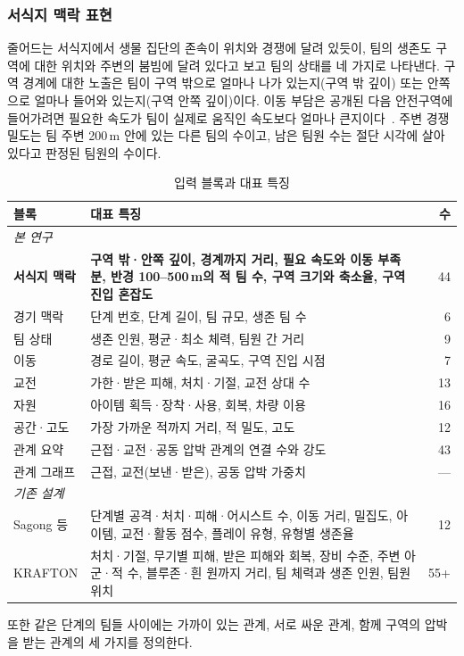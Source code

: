 \subsubsection{서식지 맥락 표현}
\label{sec:method:representation}
줄어드는 서식지에서 생물 집단의 존속이 위치와 경쟁에 달려 있듯이, 팀의 생존도 구역에 대한 위치와 주변의 붐빔에 달려 있다고 보고 팀의 상태를 네 가지로 나타낸다.
구역 경계에 대한 노출은 팀이 구역 밖으로 얼마나 나가 있는지(구역 밖 깊이) 또는 안쪽으로 얼마나 들어와 있는지(구역 안쪽 깊이)이다.
이동 부담은 공개된 다음 안전구역에 들어가려면 필요한 속도가 팀이 실제로 움직인 속도보다 얼마나 큰지이다~\cite{Nathan08}.
주변 경쟁 밀도는 팀 주변 200\,m 안에 있는 다른 팀의 수이고, 남은 팀원 수는 절단 시각에 살아 있다고 판정된 팀원의 수이다.

\begin{table}[t]
\centering
\caption{입력 블록과 대표 특징}
\label{tab:blocks}
\footnotesize
\setlength{\tabcolsep}{3pt}
\renewcommand{\arraystretch}{1.1}
\begin{tabular}{p{1.8cm}p{5.4cm}r}
\hline
블록 & 대표 특징 & 수 \\
\hline
\multicolumn{3}{l}{\emph{본 연구}} \\
\textbf{서식지 맥락} & \textbf{구역 밖·안쪽 깊이, 경계까지 거리, 필요 속도와 이동 부족분, 반경 100--500\,m의 적 팀 수, 구역 크기와 축소율, 구역 진입 혼잡도} & 44 \\
경기 맥락 & 단계 번호, 단계 길이, 팀 규모, 생존 팀 수 & 6 \\
팀 상태 & 생존 인원, 평균·최소 체력, 팀원 간 거리 & 9 \\
이동 & 경로 길이, 평균 속도, 굴곡도, 구역 진입 시점 & 7 \\
교전 & 가한·받은 피해, 처치·기절, 교전 상대 수 & 13 \\
자원 & 아이템 획득·장착·사용, 회복, 차량 이용 & 16 \\
공간·고도 & 가장 가까운 적까지 거리, 적 밀도, 고도 & 12 \\
관계 요약 & 근접·교전·공동 압박 관계의 연결 수와 강도 & 43 \\
관계 그래프 & 근접, 교전(보낸·받은), 공동 압박 가중치 & --- \\
\hline
\multicolumn{3}{l}{\emph{기존 설계}} \\
Sagong 등 & 단계별 공격·처치·피해·어시스트 수, 이동 거리, 밀집도, 아이템, 교전·활동 점수, 플레이 유형, 유형별 생존율 & 12 \\
KRAFTON & 처치·기절, 무기별 피해, 받은 피해와 회복, 장비 수준, 주변 아군·적 수, 블루존·흰 원까지 거리, 팀 체력과 생존 인원, 팀원 위치 & 55+ \\
\hline
\end{tabular}
\end{table}
또한 같은 단계의 팀들 사이에는 가까이 있는 관계, 서로 싸운 관계, 함께 구역의 압박을 받는 관계의 세 가지를 정의한다.

